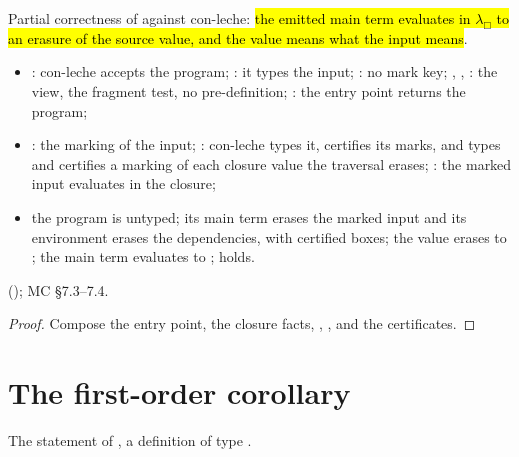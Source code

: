 \begin{theorem}
  \label{thm:EraseProof-erase_correct}
  \leanok
   Partial correctness of  against con-leche: \hl{the emitted main term evaluates in $\lambda_\Box$ to an erasure of the source value, and the value means what the input means}.
  \begin{itemize}
  \item {} : con-leche accepts the program; : it types the input; : no mark key; , , : the view, the fragment test, no pre-definition; : the entry point returns the program;
  \item {} : the marking of the input; : con-leche types it, certifies its marks, and types and certifies a marking of each closure value the traversal erases; : the marked input evaluates in the closure;
  \item {} the program is untyped; its main term erases the marked input and its environment erases the dependencies, with certified boxes; the value erases to ; the main term evaluates to ;  holds.
  \end{itemize}
    (); MC \S7.3--7.4.
\end{theorem}
\begin{proof}
  \leanok
   Compose the entry point, the closure facts, , ,  and the certificates.
\end{proof}

\section{The first-order corollary}\label{sec:final-firstorder}

\begin{definition}
  \label{def:EraseProof-erase_correct_firstorder-statement}
  \leanok
   The statement of , a definition of type .
\end{definition}


